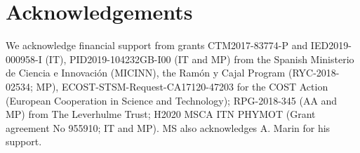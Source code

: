 \documentclass[aps,showpacs,superscriptaddress,amsfonts,twocolumn,prl]{revtex4}
\begin{document}
\section{Acknowledgements}
We acknowledge financial support from grants CTM2017-83774-P and IED2019-000958-I (IT), PID2019-104232GB-I00 (IT and MP) from the Spanish Ministerio de Ciencia e Innovaci\'on (MICINN), the Ram\'on y Cajal Program (RYC-2018-02534; MP), ECOST-STSM-Request-CA17120-47203 for the COST Action (European Cooperation in Science and Technology); RPG-2018-345 (AA and MP) from The Leverhulme Trust; H2020 MSCA ITN PHYMOT (Grant agreement No 955910; IT and MP). MS also acknowledges A. Marin for his support.


\end{document}
